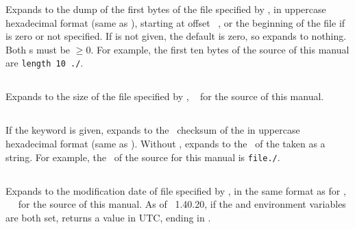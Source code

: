 \documentclass{pdftexmanual}
\begin{document}
Expands to the dump of the first   bytes
of the file specified by , in uppercase
hexadecimal format (same as ), starting at offset
~, or the beginning of the file if
 is zero or not specified. If  is not given,
the default is zero, so expands to nothing. Both s
must be $\ge0$. For example, the first ten bytes of the source of this
manual are {\tt\pdffiledump length 10 {./\jobname}}.

\subsection{}

Expands to the size of the file specified by ,
\eg\ {\tt {}} for the source of this manual.

\subsection{}

If the keyword  is given, expands to the \MDFIVE\ checksum of
the  in uppercase hexadecimal format (same as
). Without , expands to the \MDFIVE\ of the
 taken as a string. For example, the \MDFIVE\ of
the source for this manual is {\tt \pdfmdfivesum file{./\jobname}}.

\subsection{}

Expands to the modification date of file specified by , in the same format as for , \eg\ {\tt
{}} for the source of this manual. As of
\PDFTEX\ 1.40.20, if the  and
 environment variables are both set,
 returns a value in UTC, ending in .
\end{document}

